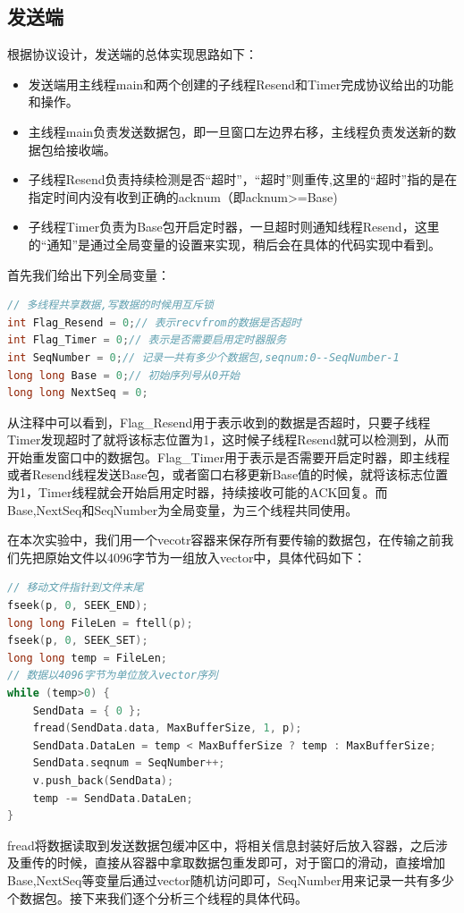 \documentclass[UTF8,a4paper,10pt]{ctexart}
\begin{document}
\subsection{发送端}
根据协议设计，发送端的总体实现思路如下：
\begin{itemize}
\item 发送端用主线程main和两个创建的子线程Resend和Timer完成协议给出的功能和操作。
\item 主线程main负责发送数据包，即一旦窗口左边界右移，主线程负责发送新的数据包给接收端。
\item 子线程Resend负责持续检测是否“超时”，“超时”则重传,这里的“超时”指的是在指定时间内没有收到正确的acknum（即acknum>=Base)
\item 子线程Timer负责为Base包开启定时器，一旦超时则通知线程Resend，这里的“通知”是通过全局变量的设置来实现，稍后会在具体的代码实现中看到。
\end{itemize}
首先我们给出下列全局变量：
\begin{lstlisting}[frame=trbl,language={C++}]
// 多线程共享数据,写数据的时候用互斥锁
int Flag_Resend = 0;// 表示recvfrom的数据是否超时
int Flag_Timer = 0;// 表示是否需要启用定时器服务
int SeqNumber = 0;// 记录一共有多少个数据包,seqnum:0--SeqNumber-1
long long Base = 0;// 初始序列号从0开始
long long NextSeq = 0;
\end{lstlisting}\par
从注释中可以看到，Flag\_Resend用于表示收到的数据是否超时，只要子线程Timer发现超时了就将该标志位置为1，这时候子线程Resend就可以检测到，从而开始重发窗口中的数据包。Flag\_Timer用于表示是否需要开启定时器，即主线程或者Resend线程发送Base包，或者窗口右移更新Base值的时候，就将该标志位置为1，Timer线程就会开始启用定时器，持续接收可能的ACK回复。而Base,NextSeq和SeqNumber为全局变量，为三个线程共同使用。\par
在本次实验中，我们用一个vecotr容器来保存所有要传输的数据包，在传输之前我们先把原始文件以4096字节为一组放入vector中，具体代码如下：
\begin{lstlisting}[frame=trbl,language={C++}]
// 移动文件指针到文件末尾
fseek(p, 0, SEEK_END);
long long FileLen = ftell(p);
fseek(p, 0, SEEK_SET);
long long temp = FileLen;
// 数据以4096字节为单位放入vector序列
while (temp>0) {
    SendData = { 0 };
    fread(SendData.data, MaxBufferSize, 1, p);
    SendData.DataLen = temp < MaxBufferSize ? temp : MaxBufferSize;
    SendData.seqnum = SeqNumber++;
    v.push_back(SendData);
    temp -= SendData.DataLen;
}
\end{lstlisting}\par
fread将数据读取到发送数据包缓冲区中，将相关信息封装好后放入容器，之后涉及重传的时候，直接从容器中拿取数据包重发即可，对于窗口的滑动，直接增加Base,NextSeq等变量后通过vector随机访问即可，SeqNumber用来记录一共有多少个数据包。接下来我们逐个分析三个线程的具体代码。
\end{document}
